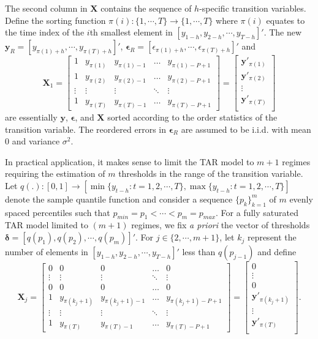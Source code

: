 The second column in $\bm{X}$ contains the sequence of $h$-specific transition variables. Define the sorting function $\pi(i):\{1,\cdots,T\}\to\{1,\cdots,T\}$   where $\pi(i)$ equates to the time index of the $i$th smallest element in $[y_{1-h},y_{2-h},\cdots,y_{T-h}]'$. The new $\bm{y}_R=[y_{\pi(1)+h},\cdots,y_{\pi(T)+h}]'$, $\bm{\epsilon}_R=[\epsilon_{\pi(1)+h},\cdots,\epsilon_{\pi(T)+h}]'$ and 
$$
\bm{X}_1=\begin{bmatrix}
    1 & y_{\pi(1)} & y_{\pi(1)-1} & \dots  & y_{\pi(1)-P+1} \\
    1 & y_{\pi(2)} & y_{\pi(2)-1} & \dots  & y_{\pi(2)-P+1} \\
    \vdots & \vdots & \vdots & \ddots & \vdots \\
    1 & y_{\pi(T)} & y_{\pi(T)-1} & \dots  & y_{\pi(T)-P+1}
\end{bmatrix}=
\begin{bmatrix}
\bm{y}'_{\pi(1)} \\
\bm{y}'_{\pi(2)} \\
\vdots \\
\bm{y}'_{\pi(T)} \\
\end{bmatrix}
$$
are essentially $\bm{y}$, $\bm{\epsilon}$, and $\bm{X}$ sorted according to the order statistics of the transition variable. The reordered errors in $\bm{\epsilon}_R$ are assumed to be i.i.d. with mean $0$ and variance $\sigma^2$.

In practical application, it makes sense to limit the TAR model to $m+1$ regimes requiring the estimation of $m$ thresholds in the range of the transition variable. Let $q(.): [0,1]\to[\min\{y_{t-h}:t=1,2,\cdots,T\},\max\{y_{t-h}:t=1,2,\cdots,T\}]$ denote the sample quantile function and consider a sequence $\{p_k\}_{k=1}^m$ of $m$ evenly spaced percentiles such that $p_{min}=p_1<\cdots<p_m=p_{max}$. For a fully saturated TAR model limited to $(m+1)$ regimes, we fix \textit{a priori} the vector of thresholds $\bm{\delta}=[q(p_{1}),q(p_2),\cdots,q(p_{m})]'$. For $j \in \{2,\cdots,m+1\}$, let $k_j$ represent the number of elements in $[y_{1-h},y_{2-h},\cdots,y_{T-h}]'$ less than $q(p_{j-1})$ and  define 
$$\bm{X}_j=
\begin{bmatrix}
    0 & 0 & 0 & \dots  & 0 \\
    \vdots & \vdots & \vdots & \ddots & \vdots \\
    0 & 0 & 0 & \dots  & 0 \\
    1 & y_{\pi(k_j+1)} & y_{\pi(k_j+1)-1} & \dots  & y_{\pi(k_j+1)-P+1} \\
    \vdots & \vdots & \vdots & \ddots & \vdots \\
    1 & y_{\pi(T)} & y_{\pi(T)-1} & \dots  & y_{\pi(T)-P+1}
\end{bmatrix}=
\begin{bmatrix}
0 \\
\vdots \\
0\\
\bm{y}'_{\pi(k_j+1)} \\
\vdots \\
\bm{y}'_{\pi(T)} \\
\end{bmatrix}.
$$

